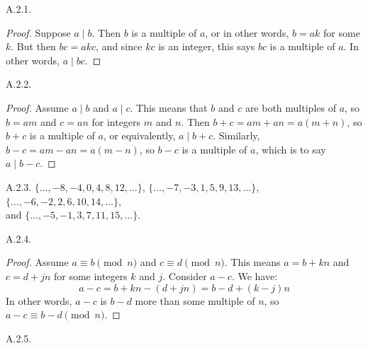  \protect {} \protect \begin {itemize} 
\begin{ans}{A.2.1.}
		\begin{proof}
			Suppose $a \mid b$.  Then $b$ is a multiple of $a$, or in other words, $b = ak$ for some $k$.  But then $bc = akc$, and since $kc$ is an integer, this says $bc$ is a multiple of $a$.  In other words, $a \mid bc$.
		\end{proof}
	
\end{ans}
\begin{ans}{A.2.2.}
		\begin{proof}
			Assume $a \mid b$ and $a \mid c$.  This means that $b$ and $c$ are both multiples of $a$, so $b = am$ and $c = an$ for integers $m$ and $n$.  Then $b+c = am+an = a(m+n)$, so $b+c$ is a multiple of $a$, or equivalently, $a \mid b+c$.  Similarly, $b-c = am-an = a(m-n)$, so $b-c$ is a multiple of $a$, which is to say $a \mid b-c$.
		\end{proof}
	
\end{ans}
\begin{ans}{A.2.3.}
		$\{\ldots, -8, -4, 0, 4, 8, 12, \ldots\}$, $\{\ldots, -7, -3, 1, 5, 9, 13, \ldots\}$, $\{\ldots, -6, -2, 2, 6, 10, 14, \ldots\}$,\\ and $\{\ldots, -5, -1, 3, 7, 11, 15, \ldots\}$.
	
\end{ans}
\begin{ans}{A.2.4.}
		\begin{proof}
			Assume $a \equiv b \pmod n$ and $c \equiv d \pmod n$.  This means $a = b + kn$ and $c = d + jn$ for some integers $k$ and $j$.  Consider $a-c$.  We have:
			\[a-c = b+kn - (d+jn) = b-d + (k-j)n\]
			In other words, $a-c$ is $b-d$ more than some multiple of $n$, so $a-c \equiv b-d \pmod n$.
		\end{proof}
	
\end{ans}
\begin{ans}{A.2.5.}
\end{ans}
\end{itemize}

